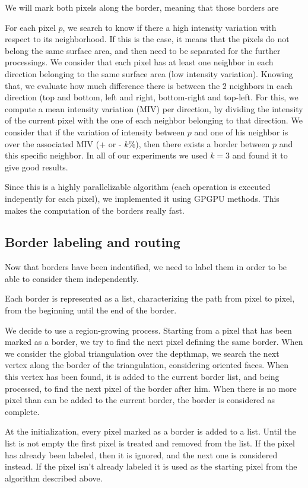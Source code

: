\documentclass[11pt,fleqn]{book} %
\begin{document}
We will mark both pixels along the border, meaning that those borders are 

For each pixel $p$, we search to know if there a high intensity variation with respect to its neighborhood. If this is the case, it means that the pixels do not belong the same surface area, and then need to be separated for the further processings.
We consider that each pixel has at least one neighbor in each direction belonging to the same surface area (low intensity variation). Knowing that, we evaluate how much difference there is between the 2 neighbors in each direction (top and bottom, left and right, bottom-right and top-left.
For this, we compute a mean intensity variation (MIV) per direction, by dividing the intensity of the current pixel with the one of each neighbor belonging to that direction. We consider that if the variation of intensity between $p$ and one of his neighbor is over the associated MIV (+ or - $k$\%), then there exists a border between $p$ and this specific neighbor. In all of our experiments we used $k = 3$ and found it to give good results.

Since this is a highly parallelizable algorithm (each operation is executed indepently for each pixel), we implemented it using GPGPU methods. This makes the computation of the borders really fast.

\subsection{Border labeling and routing}
Now that borders have been indentified, we need to label them in order to be able to consider them independently. 

Each border is represented as a list, characterizing the path from pixel to pixel, from the beginning until the end of the border.

We decide to use a region-growing process. Starting from a pixel that has been marked as a border, we try to find the next pixel defining the same border. When we consider the global triangulation over the depthmap, we search the next vertex along the border of the triangulation, considering oriented faces.
When this vertex has been found, it is added to the current border list, and being processed, to find the next pixel of the border after him.
When there is no more pixel than can be added to the current border, the border is considered as complete.

At the initialization, every pixel marked as a border is added to a list. Until the list is not empty the first pixel is treated and removed from the list. If the pixel has already been labeled, then it is ignored, and the next one is considered instead. If the pixel isn't already labeled it is used as the starting pixel from the algorithm described above.
\end{document}
